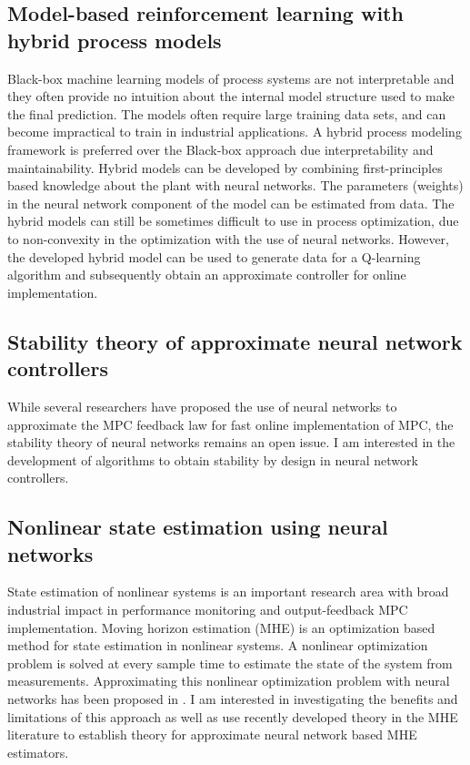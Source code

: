 \documentclass[11pt, a4paper]{article} %
\begin{document}
\subsection*{Model-based reinforcement learning with hybrid process models}

Black-box machine learning models of process systems are not interpretable and they often provide no intuition about the internal model structure used to make the final prediction. The models often require large training data sets, and can become impractical to train in industrial applications. A hybrid process modeling framework is preferred over the Black-box approach due interpretability and maintainability. Hybrid models can be developed by combining first-principles based knowledge about the plant with neural networks. The parameters (weights) in the neural network component of the model can be estimated from data. The hybrid models can still be sometimes difficult to use in process optimization, due to non-convexity in the optimization with the use of neural networks. However, the developed hybrid model can be used to generate data for a Q-learning algorithm and subsequently obtain an approximate controller for online implementation.

\subsection*{Stability theory of approximate neural network controllers}

While several researchers have proposed the use of neural networks to approximate the MPC feedback law for fast online implementation of MPC, the stability theory of neural networks remains an open issue. I am interested in the development of algorithms to obtain stability by design in neural network controllers. 

\subsection*{Nonlinear state estimation using neural networks}

State estimation of nonlinear systems is an important research area with broad industrial impact in performance monitoring and output-feedback MPC implementation. Moving horizon estimation (MHE) is an optimization based method for state estimation in nonlinear systems. A nonlinear optimization problem is solved at every sample time to estimate the state of the system from measurements. Approximating this nonlinear optimization problem with neural networks has been proposed in . I am interested in investigating the benefits and limitations of this approach as well as use recently developed theory in the MHE literature to establish theory for approximate neural network based MHE estimators.



\end{document}
